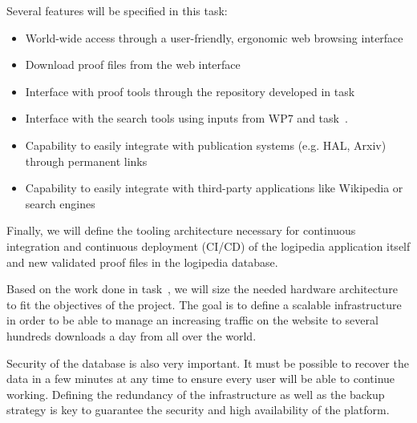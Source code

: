 \begin{workpackage}[id=access,wphases=0-48,type=MGT,
  short=Access,%
  title={Access to the infrastructure},
  lead=Inr,
  InrRM=28,
  OcaRM=6]
\begin{tasklist}
\begin{task}[id=archi,title=Defining the functional and software architecture,lead=Irt]
    Several features will be specified in this task:
    \begin{itemize}
        \item World-wide access through a user-friendly, ergonomic web browsing interface
        \item Download proof files from the web interface
        \item Interface with proof tools through the repository developed in task~
        \item Interface with the search tools using inputs from WP7 and task~.
        \item Capability to easily integrate with publication systems (e.g. HAL, Arxiv) 
            through permanent links
        \item Capability to easily integrate with third-party applications like Wikipedia 
            or search engines
    \end{itemize}

    Finally, we will define the tooling architecture necessary for continuous integration and 
    continuous deployment (CI/CD) of the logipedia application itself and new validated proof files
    in the logipedia database.

\end{task}


\begin{task}[id=infra,title=Defining the hardware architecture for the infrastructure,lead=Irt]
    Based on the work done in task~, we will size the needed hardware architecture to fit the objectives
    of the project. The goal is to define a scalable infrastructure in order to be able
    to manage an increasing traffic on the website to several hundreds downloads a day from
    all over the world.

    Security of the database is also very important. It must be possible to recover the data in a few
    minutes at any time to ensure every user will be able to continue working. Defining the redundancy of
    the infrastructure as well as the backup strategy is key to guarantee the security and high availability of
    the platform.


\end{task}
\end{tasklist}
\end{workpackage}
